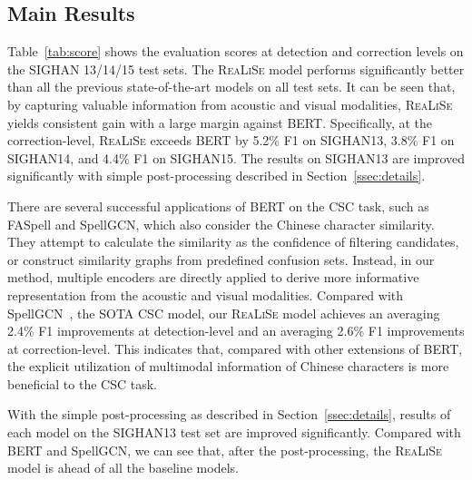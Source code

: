 \documentclass[11pt,a4paper]{article}
\newcommand\model{\textsc{ReaLiSe}}
\begin{document}
\subsection{Main Results}
\label{ssec:main-results}
Table~\ref{tab:score} shows the evaluation scores at detection and correction levels on the SIGHAN 13/14/15 test sets.
The \model{} model performs significantly better than all the previous state-of-the-art models on all test sets. It can be seen that, by capturing valuable information from acoustic and visual modalities, \model{} yields consistent gain with a large margin against BERT.
Specifically, at the correction-level, \model{} exceeds BERT by 5.2\% F1 on SIGHAN13, 3.8\% F1 on SIGHAN14, and 4.4\% F1 on SIGHAN15. 
The results on SIGHAN13 are improved significantly with simple post-processing described in Section~\ref{ssec:details}.


There are several successful applications of BERT on the CSC task, such as FASpell and SpellGCN, which also consider the Chinese character similarity. They attempt to calculate the similarity as the confidence of filtering candidates, or construct similarity graphs from predefined confusion sets. 
Instead, in our method, multiple encoders are directly applied to derive more informative representation from the acoustic and visual modalities.
Compared with SpellGCN~\citep{spellgcn}, the SOTA CSC model, our \model{} model achieves an averaging 2.4\% F1 improvements at detection-level and an averaging 2.6\% F1 improvements at correction-level.
This indicates that, compared with other extensions of BERT, the explicit utilization of multimodal information of Chinese characters is more beneficial to the CSC task.









\begin{CJK*}{UTF8}{gbsn}

With the simple post-processing as described in Section~\ref{ssec:details}, results of each model on the SIGHAN13 test set are improved significantly. Compared with BERT and SpellGCN, we can see that, after the post-processing, the \model{} model is ahead of all the baseline models.

\end{CJK*}
\end{document}
